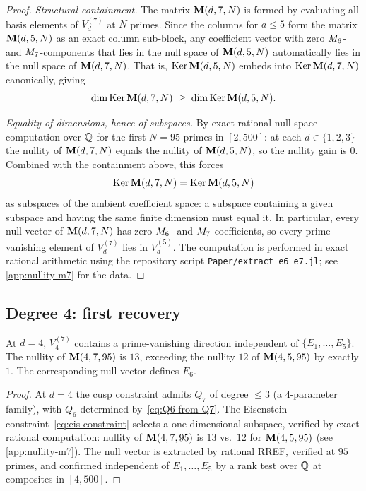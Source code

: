 \documentclass[11pt]{article}
\begin{document}
\begin{proof}
\textit{Structural containment.}
The matrix $\mathbf{M}(d,7,N)$ is formed by evaluating all basis elements of $V_d^{(7)}$ at
$N$ primes.
Since the columns for $a\le 5$ form the matrix $\mathbf{M}(d,5,N)$ as an exact column
sub-block, any coefficient vector with zero $M_{6}$- and $M_{7}$-components that
lies in the null space of $\mathbf{M}(d,5,N)$ automatically lies in the null space of
$\mathbf{M}(d,7,N)$.
That is, $\operatorname{Ker}\mathbf{M}(d,5,N)$ embeds into $\operatorname{Ker}\mathbf{M}(d,7,N)$ canonically, giving
\[
  \dim\operatorname{Ker}\mathbf{M}(d,7,N) \;\ge\; \dim\operatorname{Ker}\mathbf{M}(d,5,N).
\]

\textit{Equality of dimensions, hence of subspaces.}
By exact rational null-space computation over $\mathbb{Q}$ for the first $N=95$ primes in
$[2,500]$: at each $d\in\{1,2,3\}$ the nullity of $\mathbf{M}(d,7,N)$ equals the nullity of
$\mathbf{M}(d,5,N)$, so the nullity gain is $0$.
Combined with the containment above, this forces
\[
  \operatorname{Ker}\mathbf{M}(d,7,N) = \operatorname{Ker}\mathbf{M}(d,5,N)
\]
as subspaces of the ambient coefficient space: a subspace containing a given subspace
and having the same finite dimension must equal it.
In particular, every null vector of $\mathbf{M}(d,7,N)$ has zero $M_{6}$- and
$M_{7}$-coefficients, so every prime-vanishing element of $V_d^{(7)}$ lies in
$V_d^{(5)}$.
The computation is performed in exact rational arithmetic using the repository script
\texttt{Paper/extract\_e6\_e7.jl}; see \cref{app:nullity-m7} for the data.
\end{proof}

\subsection{Degree 4: first recovery}

\begin{proposition}
\label{prop:first-recovery-d4}
At $d=4$, $V_4^{(7)}$ contains a prime-vanishing direction independent of
$\{E_1,\dots,E_5\}$.
The nullity of $\mathbf{M}(4,7,95)$ is $13$, exceeding the nullity $12$ of $\mathbf{M}(4,5,95)$
by exactly $1$.
The corresponding null vector defines $E_6$.
\end{proposition}

\begin{proof}
At $d=4$ the cusp constraint admits $Q_7$ of degree $\le 3$ (a 4-parameter family),
with $Q_6$ determined by~\eqref{eq:Q6-from-Q7}.
The Eisenstein constraint~\eqref{eq:eis-constraint} selects a one-dimensional
subspace, verified by exact rational computation: nullity of $\mathbf{M}(4,7,95)$ is $13$
vs.\ $12$ for $\mathbf{M}(4,5,95)$ (see \cref{app:nullity-m7}).
The null vector is extracted by rational RREF, verified at $95$ primes, and confirmed
independent of $E_1,\dots,E_5$ by a rank test over $\mathbb{Q}$ at composites in $[4,500]$.
\end{proof}
\end{document}
